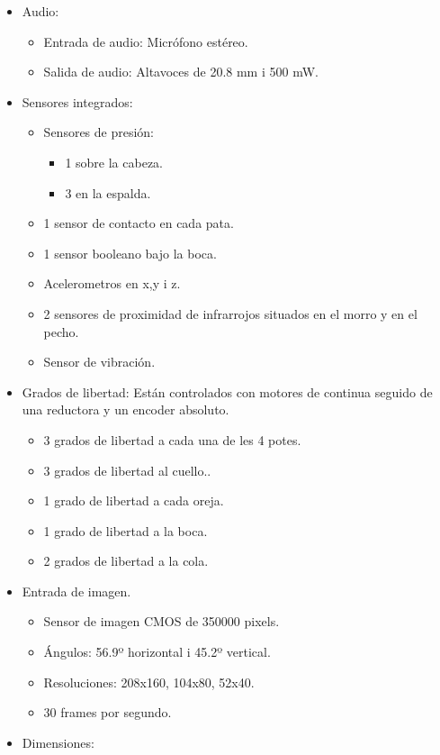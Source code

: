 \documentclass[12pt,a4paper,final,twoside]{book}
\begin{document}
\begin{multicols}{2}
\begin{itemize}
\item Audio:
\begin{itemize}
\item Entrada de audio: Micrófono estéreo.
\item Salida de audio: Altavoces de 20.8 mm i 500 mW.
\end{itemize}
\item Sensores integrados:
\begin{itemize}
\item Sensores de presión:
\begin{itemize}
\item 1 sobre la cabeza.
\item 3 en la espalda.
\end{itemize}
\item 1 sensor de contacto en cada pata. 
\item 1 sensor booleano bajo la boca.
\item Acelerometros en x,y i z.
\item 2 sensores de proximidad de infrarrojos situados en el morro y en el pecho.
\item Sensor de vibración.
\end{itemize}
\item Grados de libertad: Están controlados con motores de continua seguido de una reductora y un encoder absoluto.
\begin{itemize}
\item 3 grados de libertad a cada una de les 4 potes.
\item 3 grados de libertad al cuello..
\item 1 grado de libertad a cada oreja.
\item 1 grado de libertad a la boca.
\item 2 grados de libertad a la cola. 
\end{itemize}
\item Entrada de imagen.
\begin{itemize}
\item Sensor de imagen CMOS de 350000 pixels.
\item Ángulos: 56.9º horizontal i 45.2º vertical.
\item Resoluciones: 208x160, 104x80, 52x40.
\item 30 frames por segundo.
\end{itemize}
\item Dimensiones:
\begin{itemize}

\end{itemize}
\end{itemize}
\end{multicols}
\end{document}
